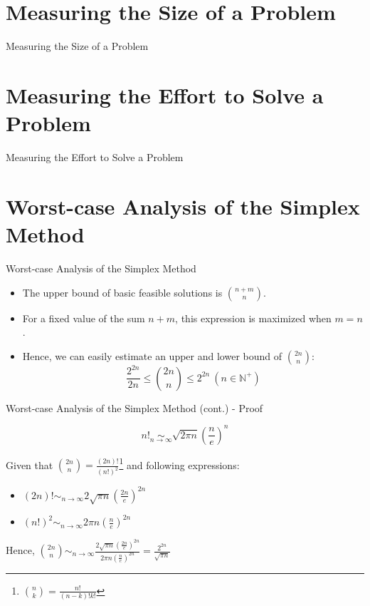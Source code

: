 \documentclass[10pt]{beamer}
\begin{document}
\section{Measuring the Size of a Problem}
\begin{frame}{Measuring the Size of a Problem}

\end{frame}

\section{Measuring the Effort to Solve a Problem}
\begin{frame}{Measuring the Effort to Solve a Problem}

\end{frame}

\section{Worst-case Analysis of the Simplex Method}
\begin{frame}{Worst-case Analysis of the Simplex Method}
\begin{itemize}
\item The upper bound of basic feasible solutions is $\displaystyle {n + m \choose n}$.
\item For a fixed value of the sum $n + m$, this expression is maximized when $m = n$.
\item Hence, we can easily estimate an upper and lower bound of $\displaystyle {2n \choose n}$\cite{Vanderbei2020}:
$$
\frac{2^{2n}}{2n} \leq {2n \choose n} \leq 2^{2n} \ (n \in \mathbb{N^+})
$$
\end{itemize}
\end{frame}
\begin{frame}{Worst-case Analysis of the Simplex Method (cont.) - Proof}
\begin{theorem}
$$
\displaystyle
n! \operatorname*{\sim}_{n\to\infty} \sqrt{2\pi n}\left(\frac{n}{e}\right)^n
$$
\end{theorem}
Given that $\displaystyle {2n \choose n} = \frac{(2n)!}{(n!)^2}$\footnote{${n \choose k} = \frac{n!}{(n - k)!k!}$} and following expressions:
\begin{itemize}
\item $\displaystyle (2n)! \operatorname*{\sim}_{n\to\infty} 2\sqrt{\pi n} \left(\frac{2n}{e}\right)^{2n}$ 
\item $\displaystyle (n!)^2 \operatorname*{\sim}_{n\to\infty} 2\pi n \left(\frac{n}{e}\right)^{2n}$ 
\end{itemize}
Hence, $\displaystyle {2n \choose n} \operatorname*{\sim}_{n\to\infty} \frac{2\sqrt{\pi n} \left(\frac{2n}{e}\right)^{2n}}{2\pi n \left(\frac{n}{e}\right)^{2n}} =  \frac{2^{2n}}{\sqrt{\pi n}}$
\end{frame}
\end{document}
